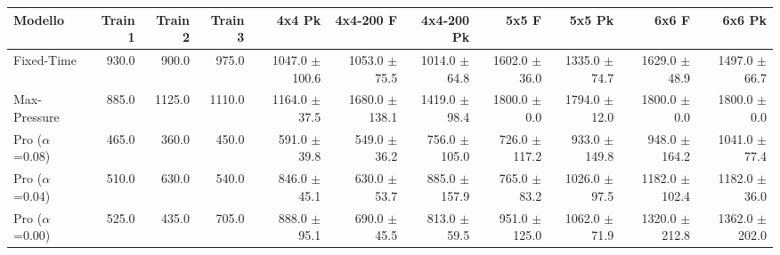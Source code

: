 \begin{table}
  \centering
  \tiny
  \begin{tabular}{@{}lrrrrrrrrrr@{}}
    \toprule
    Modello                   & Train 1 & Train 2 & Train 3 & 4x4 Pk                                        & 4x4-200 F                                     & 4x4-200 Pk                                    & 5x5 F                                         & 5x5 Pk                                        & 6x6 F                                         & 6x6 Pk                                        \\
    \midrule
    Fixed-Time                & 930.0   & 900.0   & 975.0   & 1047.0 {\fontsize{4}{4}\selectfont$\pm$100.6} & 1053.0 {\fontsize{4}{4}\selectfont$\pm$75.5}  & 1014.0 {\fontsize{4}{4}\selectfont$\pm$64.8}  & 1602.0 {\fontsize{4}{4}\selectfont$\pm$36.0}  & 1335.0 {\fontsize{4}{4}\selectfont$\pm$74.7}  & 1629.0 {\fontsize{4}{4}\selectfont$\pm$48.9}  & 1497.0 {\fontsize{4}{4}\selectfont$\pm$66.7}  \\
    Max-Pressure              & 885.0   & 1125.0  & 1110.0  & 1164.0 {\fontsize{4}{4}\selectfont$\pm$37.5}  & 1680.0 {\fontsize{4}{4}\selectfont$\pm$138.1} & 1419.0 {\fontsize{4}{4}\selectfont$\pm$98.4}  & 1800.0 {\fontsize{4}{4}\selectfont$\pm$0.0}   & 1794.0 {\fontsize{4}{4}\selectfont$\pm$12.0}  & 1800.0 {\fontsize{4}{4}\selectfont$\pm$0.0}   & 1800.0 {\fontsize{4}{4}\selectfont$\pm$0.0}   \\
    Pro ($\alpha$=0.08)       & 465.0   & 360.0   & 450.0   & 591.0 {\fontsize{4}{4}\selectfont$\pm$39.8}   & 549.0 {\fontsize{4}{4}\selectfont$\pm$36.2}   & 756.0 {\fontsize{4}{4}\selectfont$\pm$105.0}  & 726.0 {\fontsize{4}{4}\selectfont$\pm$117.2}  & 933.0 {\fontsize{4}{4}\selectfont$\pm$149.8}  & 948.0 {\fontsize{4}{4}\selectfont$\pm$164.2}  & 1041.0 {\fontsize{4}{4}\selectfont$\pm$77.4}  \\
    Pro ($\alpha$=0.04)       & 510.0   & 630.0   & 540.0   & 846.0 {\fontsize{4}{4}\selectfont$\pm$45.1}   & 630.0 {\fontsize{4}{4}\selectfont$\pm$53.7}   & 885.0 {\fontsize{4}{4}\selectfont$\pm$157.9}  & 765.0 {\fontsize{4}{4}\selectfont$\pm$83.2}   & 1026.0 {\fontsize{4}{4}\selectfont$\pm$97.5}  & 1182.0 {\fontsize{4}{4}\selectfont$\pm$102.4} & 1182.0 {\fontsize{4}{4}\selectfont$\pm$36.0}  \\
    Pro ($\alpha$=0.00)       & 525.0   & 435.0   & 705.0   & 888.0 {\fontsize{4}{4}\selectfont$\pm$95.1}   & 690.0 {\fontsize{4}{4}\selectfont$\pm$45.5}   & 813.0 {\fontsize{4}{4}\selectfont$\pm$59.5}   & 951.0 {\fontsize{4}{4}\selectfont$\pm$125.0}  & 1062.0 {\fontsize{4}{4}\selectfont$\pm$71.9}  & 1320.0 {\fontsize{4}{4}\selectfont$\pm$212.8} & 1362.0 {\fontsize{4}{4}\selectfont$\pm$202.0} \\

\end{tabular}
\end{table}
